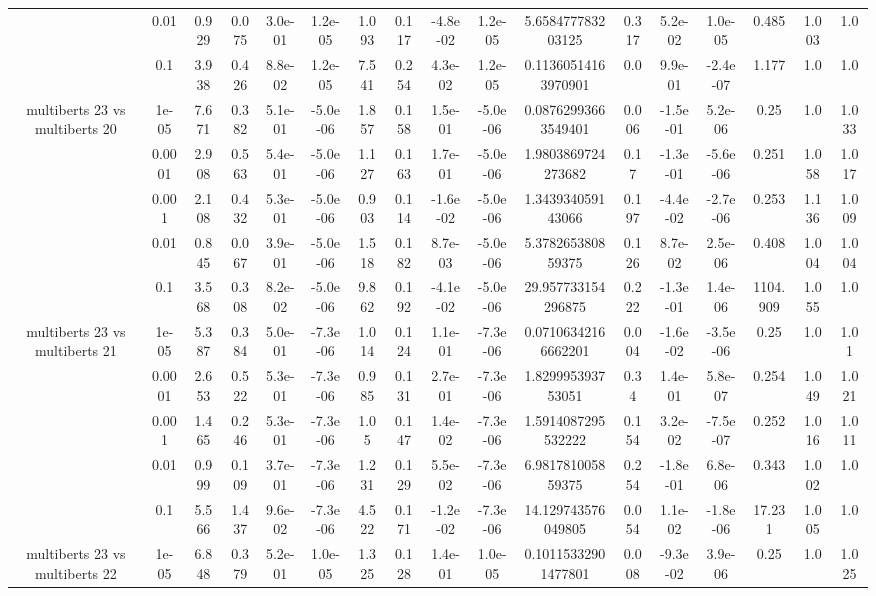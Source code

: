 \begin{tabular}{|c|c|c|c|c|c|c|c|c|c|c|c|c|c|c|c|c|}
 & 0.01 & 0.929 & 0.075 & 3.0e-01 & 1.2e-05 & 1.093 & 0.117 & -4.8e-02 & 1.2e-05 & 5.658477783203125 & 0.317 & 5.2e-02 & 1.0e-05 & 0.485 & 1.003 & 1.0 \\
 & 0.1 & 3.938 & 0.426 & 8.8e-02 & 1.2e-05 & 7.541 & 0.254 & 4.3e-02 & 1.2e-05 & 0.11360514163970901 & 0.0 & 9.9e-01 & -2.4e-07 & 1.177 & 1.0 & 1.0 \\
\hline
\multirow{5}{*}{multiberts 23 vs multiberts 20} & 1e-05 & 7.671 & 0.382 & 5.1e-01 & -5.0e-06 & 1.857 & 0.158 & 1.5e-01 & -5.0e-06 & 0.08762993663549401 & 0.006 & -1.5e-01 & 5.2e-06 & 0.25 & 1.0 & 1.033 \\
 & 0.0001 & 2.908 & 0.563 & 5.4e-01 & -5.0e-06 & 1.127 & 0.163 & 1.7e-01 & -5.0e-06 & 1.9803869724273682 & 0.17 & -1.3e-01 & -5.6e-06 & 0.251 & 1.058 & 1.017 \\
 & 0.001 & 2.108 & 0.432 & 5.3e-01 & -5.0e-06 & 0.903 & 0.114 & -1.6e-02 & -5.0e-06 & 1.343934059143066 & 0.197 & -4.4e-02 & -2.7e-06 & 0.253 & 1.136 & 1.009 \\
 & 0.01 & 0.845 & 0.067 & 3.9e-01 & -5.0e-06 & 1.518 & 0.182 & 8.7e-03 & -5.0e-06 & 5.378265380859375 & 0.126 & 8.7e-02 & 2.5e-06 & 0.408 & 1.004 & 1.004 \\
 & 0.1 & 3.568 & 0.308 & 8.2e-02 & -5.0e-06 & 9.862 & 0.192 & -4.1e-02 & -5.0e-06 & 29.957733154296875 & 0.222 & -1.3e-01 & 1.4e-06 & 1104.909 & 1.055 & 1.0 \\
\hline
\multirow{5}{*}{multiberts 23 vs multiberts 21} & 1e-05 & 5.387 & 0.384 & 5.0e-01 & -7.3e-06 & 1.014 & 0.124 & 1.1e-01 & -7.3e-06 & 0.07106342166662201 & 0.004 & -1.6e-02 & -3.5e-06 & 0.25 & 1.0 & 1.01 \\
 & 0.0001 & 2.653 & 0.522 & 5.3e-01 & -7.3e-06 & 0.985 & 0.131 & 2.7e-01 & -7.3e-06 & 1.829995393753051 & 0.34 & 1.4e-01 & 5.8e-07 & 0.254 & 1.049 & 1.021 \\
 & 0.001 & 1.465 & 0.246 & 5.3e-01 & -7.3e-06 & 1.05 & 0.147 & 1.4e-02 & -7.3e-06 & 1.5914087295532222 & 0.154 & 3.2e-02 & -7.5e-07 & 0.252 & 1.016 & 1.011 \\
 & 0.01 & 0.999 & 0.109 & 3.7e-01 & -7.3e-06 & 1.231 & 0.129 & 5.5e-02 & -7.3e-06 & 6.981781005859375 & 0.254 & -1.8e-01 & 6.8e-06 & 0.343 & 1.002 & 1.0 \\
 & 0.1 & 5.566 & 1.437 & 9.6e-02 & -7.3e-06 & 4.522 & 0.171 & -1.2e-02 & -7.3e-06 & 14.129743576049805 & 0.054 & 1.1e-02 & -1.8e-06 & 17.231 & 1.005 & 1.0 \\
\hline
\multirow{5}{*}{multiberts 23 vs multiberts 22} & 1e-05 & 6.848 & 0.379 & 5.2e-01 & 1.0e-05 & 1.325 & 0.128 & 1.4e-01 & 1.0e-05 & 0.10115332901477801 & 0.008 & -9.3e-02 & 3.9e-06 & 0.25 & 1.0 & 1.025 \\

\end{tabular}
